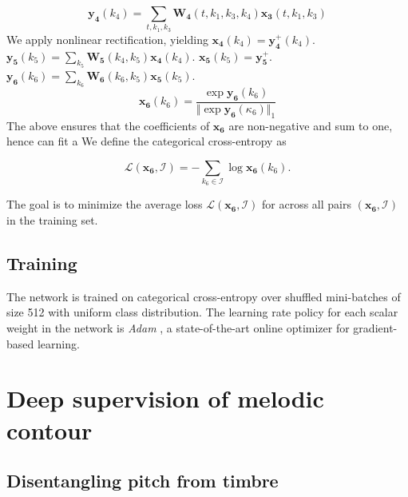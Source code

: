 \documentclass{article}
\begin{document}
\begin{equation}
\boldsymbol{y_4}(k_4) =
\sum_{t,k_1,k_3}
\boldsymbol{W_4}(t, k_1, k_3, k_4)
\boldsymbol{x_3}(t, k_1, k_3)
\end{equation}
We apply nonlinear rectification, yielding $\boldsymbol{x_4}(k_4) = \boldsymbol{y_4^{+}}(k_4)$. $\boldsymbol{y_5}(k_5) = \sum_{k_5} \boldsymbol{W_5}(k_4,k_5) \boldsymbol{x_4}(k_4)$. $\boldsymbol{x_5}(k_5) = \boldsymbol{y_5^{+}}$. $\boldsymbol{y_6}(k_6) = \sum_{k_6} \boldsymbol{W_6}(k_6,k_5) \boldsymbol{x_5}(k_5)$.
\begin{equation}
\boldsymbol{x_6}(k_6) =
\dfrac{\exp \boldsymbol{y_6}(k_6)}
{ \Vert \exp \boldsymbol{y_6}(\kappa_6) \Vert_1}
\end{equation}
The above ensures that the coefficients of $\boldsymbol{x_6}$ are non-negative and sum to one, hence can fit a 
We define the categorical cross-entropy as

\begin{equation}
\mathscr{L}(\boldsymbol{x_6}, \mathcal{I}) =
- \sum_{k_6 \in \mathcal{I}} \log \boldsymbol{x_6}(k_6).
\end{equation}

The goal is to minimize the average loss $\mathscr{L}(\boldsymbol{x_6}, \mathcal{I})$ for across all pairs $(\boldsymbol{x_6}, \mathcal{I})$ in the training set.

\subsection{Training}
The network is trained on categorical cross-entropy over shuffled mini-batches of size 512 with uniform class distribution. The learning rate policy for each scalar weight in the network is  \emph{Adam} \cite{Kingma2015}, a state-of-the-art online optimizer for gradient-based learning.


\section{Deep supervision of melodic contour}
\subsection{Disentangling pitch from timbre}
\end{document}
